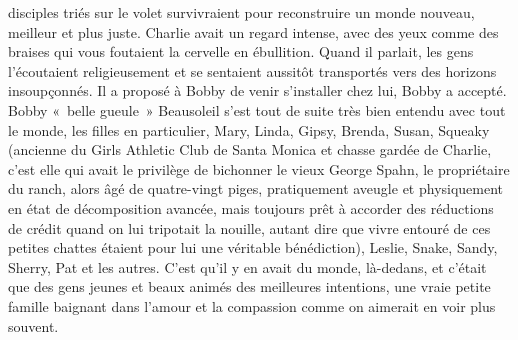 disciples triés sur le volet survivraient pour reconstruire un monde nouveau, meilleur et plus juste. Charlie avait un regard intense, avec des yeux comme des braises qui vous foutaient la cervelle en ébullition. Quand il parlait, les gens l’écoutaient religieusement et se sentaient aussitôt transportés vers des horizons insoupçonnés. Il a proposé à Bobby de venir s’installer chez lui, Bobby a accepté. Bobby «~belle gueule~» Beausoleil s’est tout de suite très bien entendu avec tout le monde, les filles en particulier, Mary, Linda, Gipsy, Brenda, Susan, Squeaky (ancienne du Girls Athletic Club de Santa Monica et chasse gardée de Charlie, c’est elle qui avait le privilège de bichonner le vieux George Spahn, le propriétaire du ranch, alors âgé de quatre-vingt piges, pratiquement aveugle et physiquement en état de décomposition avancée, mais toujours prêt à accorder des réductions de crédit quand on lui tripotait la nouille, autant dire que vivre entouré de ces petites chattes étaient pour lui une véritable bénédiction), Leslie, Snake, Sandy, Sherry, Pat et les autres. C’est qu’il y en avait du monde, là-dedans, et c’était que des gens jeunes et beaux animés des meilleures intentions, une vraie petite famille baignant dans l’amour et la compassion comme on aimerait en voir plus souvent. 

